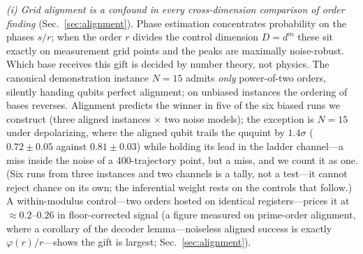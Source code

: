 \documentclass[aps,pra,reprint,superscriptaddress,nofootinbib,floatfix]{revtex4-2}
\begin{document}
\emph{(i) Grid alignment is a confound in every cross-dimension
comparison of order finding} (Sec.~\ref{sec:alignment}). Phase
estimation concentrates probability on the phases $s/r$; when the order
$r$ divides the control dimension $D=d^m$ these sit exactly on
measurement grid points and the peaks are maximally noise-robust. Which
base receives this gift is decided by number theory, not physics. The
canonical demonstration instance $N=15$ admits \emph{only} power-of-two
orders, silently handing qubits perfect alignment; on unbiased instances
the ordering of bases reverses. Alignment predicts the winner in five of the six
biased runs we construct (three aligned instances $\times$ two noise
models); the exception is $N=15$ under depolarizing, where the aligned
qubit trails the ququint by $1.4\sigma$ ($0.72\pm0.05$ against
$0.81\pm0.03$) while holding its lead in the ladder channel---a miss
inside the noise of a 400-trajectory point, but a miss, and we count
it as one. (Six runs from three instances and two channels is a tally,
not a test---it cannot reject chance on its own; the inferential
weight rests on the controls that follow.) A within-modulus control---two orders
hosted on identical registers---prices it at ${\approx}0.2$--$0.26$ in
floor-corrected signal (a figure measured on prime-order alignment,
where a corollary of the decoder lemma---noiseless aligned success is
exactly $\varphi(r)/r$---shows the gift is largest;
Sec.~\ref{sec:alignment}).
\end{document}
